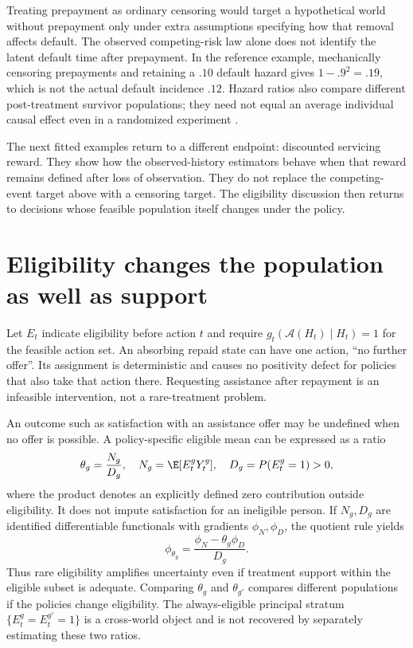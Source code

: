Treating prepayment as ordinary censoring would target a hypothetical
world without prepayment only under extra assumptions specifying how
that removal affects default. The observed competing-risk law alone
does not identify the latent default time after prepayment. In the
reference example, mechanically censoring prepayments and retaining
a $.10$ default hazard gives $1-.9^2=.19$, which is not the actual
default incidence $.12$. Hazard ratios also compare different
post-treatment survivor populations; they need not equal an average
individual causal effect even in a randomized experiment
\citep[Technical Point 8.1 and Section 17.2]{hernan2020}.

The next fitted examples return to a different endpoint: discounted
servicing reward. They show how the observed-history estimators behave
when that reward remains defined after loss of observation. They do not
replace the competing-event target above with a censoring target. The
eligibility discussion then returns to decisions whose feasible population
itself changes under the policy.



\section{Eligibility changes the population as well as support}
\label{r3:eligibility}
Let $E_t$ indicate eligibility before action $t$ and require
$g_t(\mathcal A(H_t)\mid H_t)=1$ for the feasible action set.
An absorbing repaid state can have one action, ``no further offer''.
Its assignment is deterministic and causes no positivity defect for
policies that also take that action there. Requesting assistance after
repayment is an infeasible intervention, not a rare-treatment problem.

An outcome such as satisfaction with an assistance offer may be
undefined when no offer is possible. A policy-specific eligible mean
can be expressed as a ratio
\[
 \theta_g=\frac{N_g}{D_g},\quad
 N_g=\E[E_t^gY_t^g],\quad D_g=P(E_t^g=1)>0,
\]
where the product denotes an explicitly defined zero contribution
outside eligibility. It does not impute satisfaction for an ineligible
person. If $N_g,D_g$ are identified differentiable functionals with
gradients $\phi_N,\phi_D$, the quotient rule yields
\[
 \phi_{\theta_g}=\frac{\phi_N-\theta_g\phi_D}{D_g}.
\]
Thus rare eligibility amplifies uncertainty even if treatment support
within the eligible subset is adequate. Comparing $\theta_g$ and
$\theta_{g'}$ compares different populations if the policies change
eligibility. The always-eligible principal stratum
$\{E_t^g=E_t^{g'}=1\}$ is a cross-world object and is not recovered
by separately estimating these two ratios.

